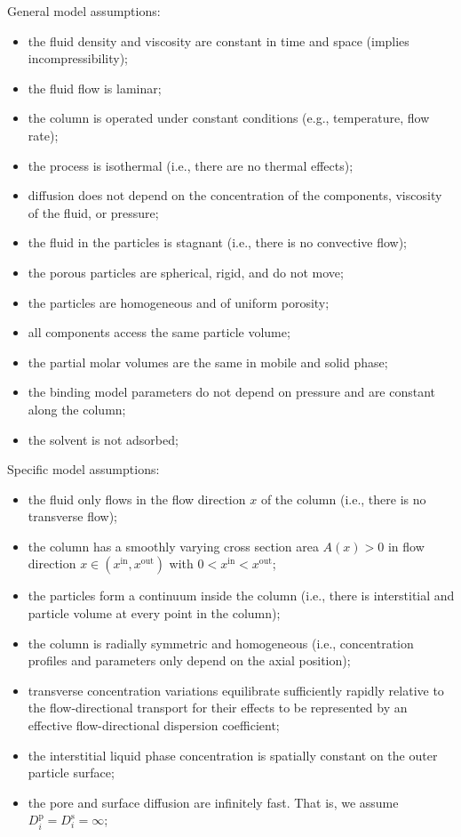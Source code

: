 \documentclass{article}
\begin{document}
General model assumptions:
\begin{itemize}
    \item the fluid density and viscosity are constant in time and space (implies incompressibility);
    \item the fluid flow is laminar;
    \item the column is operated under constant conditions (e.g., temperature, flow rate);
    \item the process is isothermal (i.e., there are no thermal effects);
    \item diffusion does not depend on the concentration of the components, viscosity of the fluid, or pressure;
    \item the fluid in the particles is stagnant (i.e., there is no convective flow);
    \item the porous particles are spherical, rigid, and do not move;
    \item the particles are homogeneous and of uniform porosity;
    \item all components access the same particle volume;
    \item the partial molar volumes are the same in mobile and solid phase;
    \item the binding model parameters do not depend on pressure and are constant along the column;
    \item the solvent is not adsorbed;
\end{itemize}

Specific model assumptions:
\begin{itemize}
    \item the fluid only flows in the flow direction $x$ of the column (i.e., there is no transverse flow);
    \item the column has a smoothly varying cross section area $A(x) > 0$ in flow direction $x \in (x^{\mathrm{in}}, x^{\mathrm{out}})$ with $0 < x^{\mathrm{in}} < x^{\mathrm{out}}$;
    \item the particles form a continuum inside the column (i.e., there is interstitial and particle volume at every point in the column);
    \item the column is radially symmetric and homogeneous (i.e., concentration profiles and parameters only depend on the axial position);
    \item transverse concentration variations equilibrate sufficiently rapidly relative to the flow-directional transport for their effects to be represented by an effective flow-directional dispersion coefficient;
    \item the interstitial liquid phase concentration is spatially constant on the outer particle surface;
    \item the pore and surface diffusion are infinitely fast. That is, we assume $D^{\mathrm{p}}_{i} = D^{\mathrm{s}}_{i} = \infty$;
\end{itemize}
\end{document}
